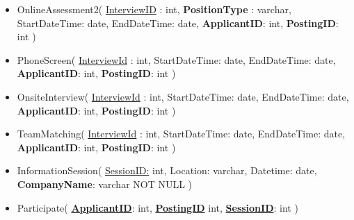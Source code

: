 \begin{itemize}
  \item OnlineAssessment2(
      \underline{InterviewID} : int,
      \textbf{PositionType} : varchar,
      StartDateTime: date,
      EndDateTime: date,
      \textbf{ApplicantID}: int,
      \textbf{PostingID}: int
    )

  \item PhoneScreen(
      \underline{InterviewId} : int,
      StartDateTime: date,
      EndDateTime: date,
      \textbf{ApplicantID}: int,
      \textbf{PostingID}: int
    )

  \item OnsiteInterview(
      \underline{InterviewId} : int,
      StartDateTime: date,
      EndDateTime: date,
      \textbf{ApplicantID}: int,
      \textbf{PostingID}: int
    )
    
  \item TeamMatching(
      \underline{InterviewId} : int,
      StartDateTime: date,
      EndDateTime: date,
      \textbf{ApplicantID}: int,
      \textbf{PostingID}: int
    )

  \item InformationSession(
      \underline{SessionID:}  int,
      Location: varchar,
      Datetime: date,
      \textbf{CompanyName}: varchar NOT NULL
    )

  \item Participate(
      \underline{\textbf{ApplicantID}}: int,
      \underline{\textbf{PostingID}}  int,
      \underline{\textbf{SessionID}}: int
    )

\end{itemize}
